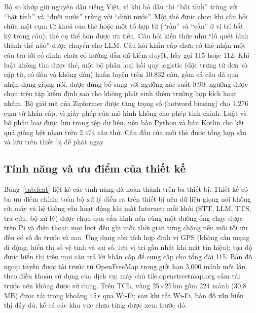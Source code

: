 \documentclass[a4paper,12pt,twocolumn]{article}
\begin{document}
Bộ so khớp giữ nguyên dấu tiếng Việt, vì khi bỏ dấu thì ``bất tỉnh'' trùng với ``bật tính'' và ``đuối nước'' trùng với ``dưới nước''. Một thẻ được chọn khi câu hỏi chứa một cụm từ khoá của thẻ hoặc một tổ hợp từ (``rắn'' và ``cắn'' ở vị trí bất kỳ trong câu); thẻ cụ thể hơn được ưu tiên. Câu hỏi kiến thức như ``lũ quét hình thành thế nào'' được chuyển cho LLM. Câu hỏi khẩn cấp chưa có thẻ nhận một câu trả lời cố định: chưa có hướng dẫn đã kiểm duyệt, hãy gọi 115 hoặc 112. Khi luật không tìm được thẻ, một bộ phân loại hồi quy logistic (đặc trưng từ đơn và cặp từ, có dấu và không dấu) huấn luyện trên 10.832 câu, gồm cả câu đã qua nhận dạng giọng nói, được dùng bổ sung với ngưỡng xác suất 0,90; ngưỡng được chọn trên tập kiểm định sao cho không phát sinh thêm trường hợp kích hoạt nhầm. Bộ giải mã của Zipformer được tăng trọng số (hotword biasing) cho 1.276 cụm từ khẩn cấp, vì giấy phép của mô hình không cho phép tinh chỉnh. Luật và bộ phân loại được lưu trong tệp dữ liệu, nên bản Python và bản Kotlin cho kết quả giống hệt nhau trên 2.474 câu thử. Câu đầu của mỗi thẻ được tổng hợp sẵn và lưu trên thiết bị để phát ngay.

\subsection{Tính năng và ưu điểm của thiết kế}
Bảng~\ref{tab:feat} liệt kê các tính năng đã hoàn thành trên ba thiết bị. Thiết kế có ba ưu điểm chính: toàn bộ xử lý diễn ra trên thiết bị nên dữ liệu giọng nói không rời máy và hệ thống vẫn hoạt động khi mất Internet; mỗi khối (STT, LLM, TTS, tra cứu, bộ xử lý) được chọn qua cấu hình nên cùng một đường ống chạy được trên Pi và điện thoại; mọi lượt đều ghi mốc thời gian từng chặng nên mỗi tối ưu đều có số đo trước và sau. Ứng dụng còn tích hợp định vị GPS (không cần mạng di động, hiển thị số vệ tinh và sai số, lưu vị trí gần nhất khi mất tín hiệu); tọa độ được hiển thị trên mọi câu trả lời khẩn cấp để cung cấp cho tổng đài 115. Bản đồ ngoại tuyến được tải trước từ OpenFreeMap trong giới hạn 3.000 mảnh mỗi lần theo điều khoản sử dụng của dịch vụ; máy chủ tile.openstreetmap.org cấm tải trước nên không được sử dụng. Trên TCL, vùng 25$\times$25\,km gồm 224 mảnh (30,8\,MB) được tải trong khoảng 45\,s qua Wi-Fi; sau khi tắt Wi-Fi, bản đồ vẫn hiển thị đầy đủ, kể cả các khu vực chưa từng được xem trước đó.
\end{document}
